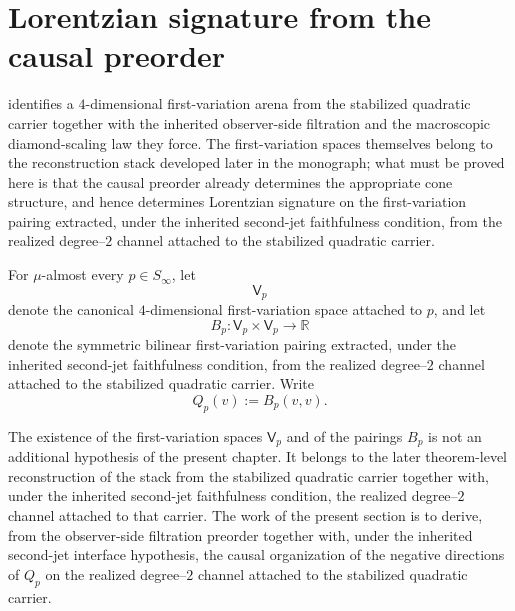 \section{Lorentzian signature from the causal preorder}
\label{sec:lorentz}
 identifies a \(4\)-dimensional first-variation
arena from the stabilized quadratic carrier together with the
inherited observer-side filtration and the macroscopic
diamond-scaling law they force.  The first-variation spaces themselves
belong to the reconstruction stack developed later in the monograph;
what must be proved here is that the causal preorder already
determines the appropriate cone structure, and hence determines
Lorentzian signature on the first-variation pairing extracted, under
the inherited second-jet faithfulness condition, from the realized
degree--\(2\) channel attached to the stabilized quadratic carrier.
\begin{definition}
	For \(\mu\)-almost every \(p\in S_\infty\), let
	\[
		\mathsf V_p
	\]
	denote the canonical \(4\)-dimensional first-variation space attached
	to \(p\), and let
	\[
		B_p:\mathsf V_p\times \mathsf V_p\to\mathbb R
	\]
	denote the symmetric bilinear first-variation pairing extracted,
	under the inherited second-jet faithfulness condition, from the
	realized degree--\(2\) channel attached to the stabilized quadratic
	carrier.  Write
	\[
		Q_p(v):=B_p(v,v).
	\]
\end{definition}
\begin{remark}
	The existence of the first-variation spaces \(\mathsf V_p\) and of the
	pairings \(B_p\) is not an additional hypothesis of the present
	chapter.  It belongs to the later theorem-level reconstruction of the
	stack from the stabilized quadratic carrier together with, under the
	inherited second-jet faithfulness condition, the realized
	degree--\(2\) channel attached to that carrier.  The work of the
	present section is to derive, from the observer-side filtration
	preorder together with, under the inherited second-jet interface
	hypothesis, the causal organization of the negative directions of
	\(Q_p\) on the realized degree--\(2\) channel attached to the
	stabilized quadratic carrier.
\end{remark}
